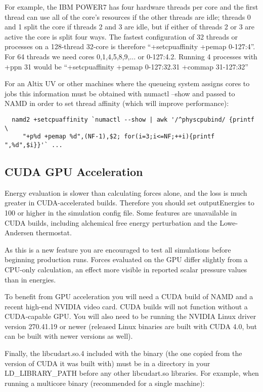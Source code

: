 For example, the IBM POWER7 has four hardware threads per core and the
first thread can use all of the core's resources if the other threads are
idle; threads 0 and 1 split the core if threads 2 and 3 are idle, but
if either of threads 2 or 3 are active the core is split four ways.  The
fastest configuration of 32 threads or processes on a 128-thread 32-core
is therefore ``+setcpuaffinity +pemap 0-127:4''.  For 64 threads we need
cores 0,1,4,5,8,9,... or 0-127:4.2.  Running 4 processes with +ppn 31
would be ``+setcpuaffinity +pemap 0-127:32.31 +commap 31-127:32''

For an Altix UV or other machines where the queueing system assigns cores
to jobs this information must be obtained with numactl --show and passed
to NAMD in order to set thread affinity (which will improve performance):

\begin{verbatim}
  namd2 +setcpuaffinity `numactl --show | awk '/^physcpubind/ {printf \
     "+p%d +pemap %d",(NF-1),$2; for(i=3;i<=NF;++i){printf ",%d",$i}}'` ...
\end{verbatim}

\subsection{CUDA GPU Acceleration}

Energy evaluation is slower than calculating forces alone, and the loss
is much greater in CUDA-accelerated builds.  Therefore you should set
outputEnergies to 100 or higher in the simulation config file.  Some
features are unavailable in CUDA builds, including alchemical free
energy perturbation and the {Lowe-Andersen} thermostat.

As this is a new feature you are encouraged to test all simulations
before beginning production runs.  Forces evaluated on the GPU differ
slightly from a CPU-only calculation, an effect more visible in reported
scalar pressure values than in energies.

To benefit from GPU acceleration you will need a CUDA build of NAMD
and a recent high-end NVIDIA video card.  CUDA builds will not function
without a CUDA-capable GPU.  You will also need to be running the
NVIDIA Linux driver version 270.41.19 or newer (released Linux binaries
are built with CUDA 4.0, but can be built with newer versions as well).

Finally, the libcudart.so.4 included with the binary (the one copied from
the version of CUDA it was built with) must be in a directory in your
LD\_LIBRARY\_PATH before any other libcudart.so libraries.  For example,
when running a multicore binary (recommended for a single machine):

